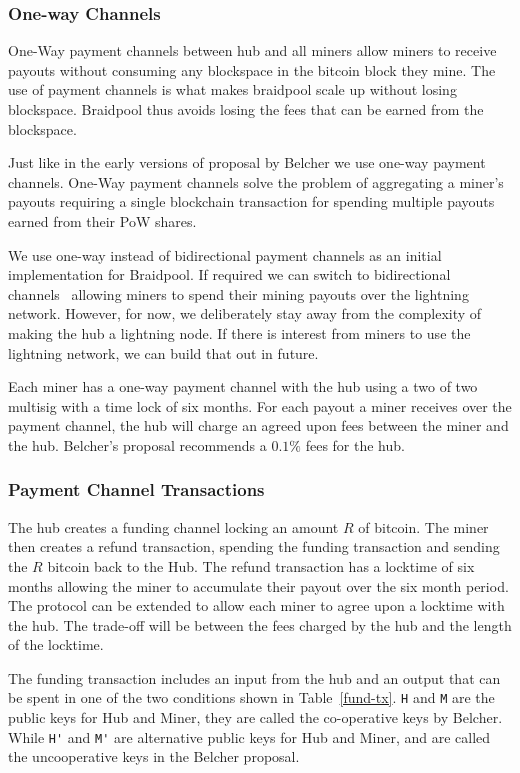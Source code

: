 \documentclass{article}
\begin{document}
\subsubsection{One-way Channels}

One-Way payment channels between hub and all miners allow miners to
receive payouts without consuming any blockspace in the bitcoin block
they mine. The use of payment channels is what makes braidpool scale
up without losing blockspace. Braidpool thus avoids losing the fees
that can be earned from the blockspace.

Just like in the early versions of proposal by Belcher we use one-way
payment channels. One-Way payment channels solve the problem of
aggregating a miner's payouts requiring a single blockchain
transaction for spending multiple payouts earned from their PoW
shares.

We use one-way instead of bidirectional payment channels as an initial
implementation for Braidpool. If required we can switch to
bidirectional channels~\cite{poon2016bitcoin} allowing miners to spend
their mining payouts over the lightning network. However, for now, we
deliberately stay away from the complexity of making the hub a
lightning node. If there is interest from miners to use the lightning
network, we can build that out in future.

Each miner has a one-way payment channel with the hub using a two of
two multisig with a time lock of six months. For each payout a miner
receives over the payment channel, the hub will charge an agreed upon
fees between the miner and the hub. Belcher's proposal recommends a
$0.1\%$ fees for the hub.

\subsubsection{Payment Channel Transactions}

The hub creates a funding channel locking an amount $R$ of
bitcoin. The miner then creates a refund transaction, spending the
funding transaction and sending the $R$ bitcoin back to the Hub. The
refund transaction has a locktime of six months allowing the miner to
accumulate their payout over the six month period. The protocol can be
extended to allow each miner to agree upon a locktime with the
hub. The trade-off will be between the fees charged by the hub and the
length of the locktime.

The funding transaction includes an input from the hub and an output
that can be spent in one of the two conditions shown in
Table~\ref{fund-tx}. \verb|H| and \verb|M| are the public keys for Hub
and Miner, they are called the co-operative keys by Belcher. While
\verb|H'| and \verb|M'| are alternative public keys for Hub and Miner,
and are called the uncooperative keys in the Belcher proposal.
\end{document}

